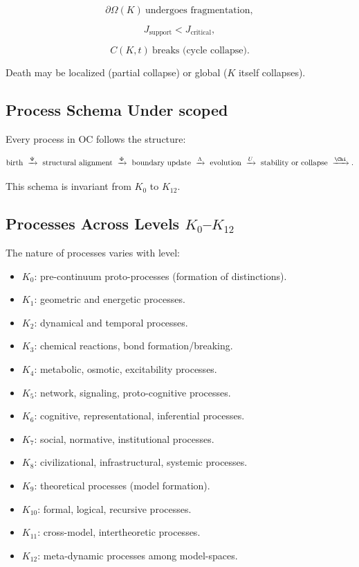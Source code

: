\[
\partial\Omega(K) \ \text{undergoes fragmentation},
\]

\[
J_{\mathrm{support}} < J_{\mathrm{critical}},
\]

\[
C(K,t) \ \text{breaks (cycle collapse)}.
\]

Death may be localized (partial collapse) or global ($K$ itself collapses).

\subsection{Process Schema Under scoped}

Every process in OC follows the structure:

\[
\text{birth} 
\ \xrightarrow{\Psi}
\ \text{structural alignment}
\ \xrightarrow{\Phi}
\ \text{boundary update}
\ \xrightarrow{\Lambda}
\ \text{evolution}
\ \xrightarrow{U}
\ \text{stability or collapse}
\ \xrightarrow{\Chi}.
\]

This schema is invariant from $K_0$ to $K_{12}$.

\subsection{Processes Across Levels \texorpdfstring{$K_0$}{K_0}--$K_{12}$}

The nature of processes varies with level:

\begin{itemize}
    \item $K_0$: pre-continuum proto-processes (formation of distinctions).
    \item $K_1$: geometric and energetic processes.
    \item $K_2$: dynamical and temporal processes.
    \item $K_3$: chemical reactions, bond formation/breaking.
    \item $K_4$: metabolic, osmotic, excitability processes.
    \item $K_5$: network, signaling, proto-cognitive processes.
    \item $K_6$: cognitive, representational, inferential processes.
    \item $K_7$: social, normative, institutional processes.
    \item $K_8$: civilizational, infrastructural, systemic processes.
    \item $K_9$: theoretical processes (model formation).
    \item $K_{10}$: formal, logical, recursive processes.
    \item $K_{11}$: cross-model, intertheoretic processes.
    \item $K_{12}$: meta-dynamic processes among model-spaces.
\end{itemize}

